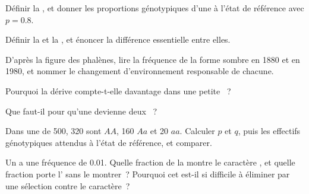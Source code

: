 \begin{exercise}[$\star$]\label{exo:g12:selection-drift-speciation:1}
Définir la , et donner les proportions génotypiques
d'une  à l'état de référence avec $p = 0.8$.
\end{exercise}

\begin{exercise}[$\star$]\label{exo:g12:selection-drift-speciation:2}
Définir la  et la , et énoncer la
différence essentielle entre elles.
\end{exercise}

\begin{exercise}[$\star$]\label{exo:g12:selection-drift-speciation:3}
D'après la figure des phalènes, lire la fréquence de la forme sombre en
1880 et en 1980, et nommer le changement d'environnement responsable de
chacune.
\end{exercise}

\begin{exercise}[$\star$]\label{exo:g12:selection-drift-speciation:4}
Pourquoi la dérive compte-t-elle davantage dans une petite ~?
\end{exercise}

\begin{exercise}[$\star$]\label{exo:g12:selection-drift-speciation:5}
Que faut-il pour qu'une  devienne deux ~?
\end{exercise}

\begin{exercise}[$\star\star$]\label{exo:g12:selection-drift-speciation:6}
Dans une  de 500, 320 sont $AA$, 160 $Aa$ et 20 $aa$.
Calculer $p$ et $q$, puis les effectifs génotypiques attendus à l'état
de référence, et comparer.
\end{exercise}

\begin{exercise}[$\star\star$]\label{exo:g12:selection-drift-speciation:7}
Un   a une fréquence de 0.01. Quelle fraction de la
 montre le caractère , et quelle fraction porte
l' sans le montrer~? Pourquoi cet  est-il si difficile à
éliminer par une sélection contre le caractère~?
\end{exercise}

